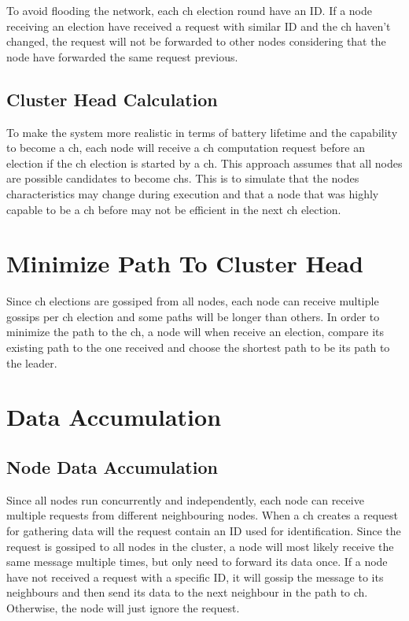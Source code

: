 \documentclass[USenglish]{uit-thesis}
\begin{document}
To avoid flooding the network, each \gls{ch} election round have an ID. If a node receiving an election have received a request with similar ID and the \gls{ch} haven't changed, the request will not be forwarded to other nodes considering that the node have forwarded the same request previous.

\subsection{Cluster Head Calculation}
To make the system more realistic in terms of battery lifetime and the capability to become a \gls{ch}, each node will receive a \gls{ch} computation request before an election if the \gls{ch} election is started by a \gls{ch}. This approach assumes that all nodes are possible candidates to become \gls{ch}s. This is to simulate that the nodes characteristics may change during execution and that a node that was highly capable to be a \gls{ch} before may not be efficient in the next \gls{ch} election.


\section{Minimize Path To Cluster Head}
Since \gls{ch} elections are gossiped from all nodes, each node can receive multiple gossips per \gls{ch} election and some paths will be longer than others. In order to minimize the path to the \gls{ch}, a node will when receive an election, compare its existing path to the one received \cite{dijkstra} and choose the shortest path to be its path to the leader.





\section{Data Accumulation}


\subsection{Node Data Accumulation}
Since all nodes run concurrently and independently, each node can receive multiple requests from different neighbouring nodes. When a \gls{ch} creates a request for gathering data will the request contain an ID used for identification. Since the request is gossiped to all nodes in the cluster, a node will most likely receive the same message multiple times, but only need to forward its data once. If a node have not received a request with a specific ID, it will gossip the message to its neighbours and then send its data to the next neighbour in the path to \gls{ch}. Otherwise, the node will just ignore the request.
\end{document}
